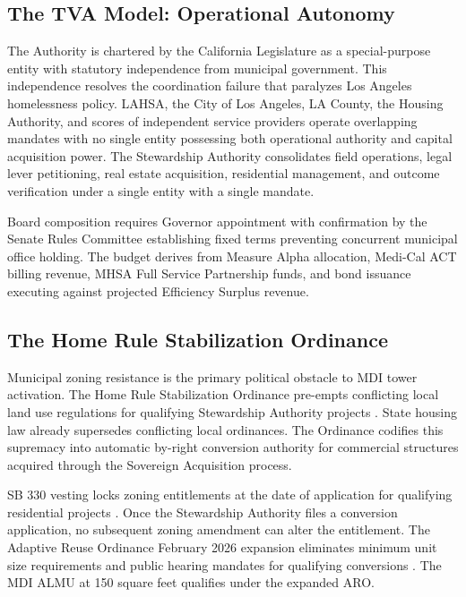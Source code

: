 \documentclass[12pt, letterpaper]{article}
\begin{document}
\subsection{The TVA Model: Operational Autonomy}

The Authority is chartered by the California Legislature as a special-purpose entity with statutory independence from municipal government. This independence resolves the coordination failure that paralyzes Los Angeles homelessness policy. LAHSA, the City of Los Angeles, LA County, the Housing Authority, and scores of independent service providers operate overlapping mandates with no single entity possessing both operational authority and capital acquisition power. The Stewardship Authority consolidates field operations, legal lever petitioning, real estate acquisition, residential management, and outcome verification under a single entity with a single mandate.

Board composition requires Governor appointment with confirmation by the Senate Rules Committee establishing fixed terms preventing concurrent municipal office holding. The budget derives from Measure Alpha allocation, Medi-Cal ACT billing revenue, MHSA Full Service Partnership funds, and bond issuance executing against projected Efficiency Surplus revenue.

\subsection{The Home Rule Stabilization Ordinance}

Municipal zoning resistance is the primary political obstacle to MDI tower activation. The Home Rule Stabilization Ordinance pre-empts conflicting local land use regulations for qualifying Stewardship Authority projects \citep{holland_knight_2025}. State housing law already supersedes conflicting local ordinances. The Ordinance codifies this supremacy into automatic by-right conversion authority for commercial structures acquired through the Sovereign Acquisition process.

SB 330 vesting locks zoning entitlements at the date of application for qualifying residential projects \citep{la_planning_sb330_2026}. Once the Stewardship Authority files a conversion application, no subsequent zoning amendment can alter the entitlement. The Adaptive Reuse Ordinance February 2026 expansion eliminates minimum unit size requirements and public hearing mandates for qualifying conversions \citep{la_planning_aro_2026}. The MDI ALMU at 150 square feet qualifies under the expanded ARO.
\end{document}
